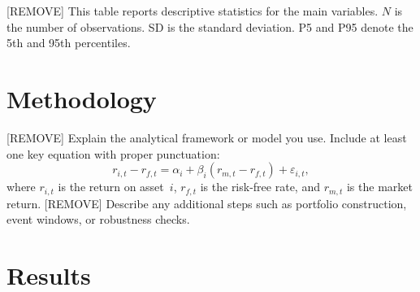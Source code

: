 \documentclass[12pt]{article}
\begin{document}
\begin{table}[!ht]
\caption{[REMOVE] Descriptive Statistics.}
{\footnotesize
[REMOVE] This table reports descriptive statistics for the main
variables. $N$ is the number of observations. SD is the standard
deviation. P5 and P95 denote the 5th and 95th percentiles.}
\vspace{2mm}
\begin{center}
\label{tab:descriptive}
\end{center}
\end{table}




\section{Methodology}\label{sec:methodology}

[REMOVE] Explain the analytical framework or model you use. Include
at least one key equation with proper punctuation:
\begin{equation}\label{eq:model}
  r_{i,t} - r_{f,t}
    = \alpha_i + \beta_i (r_{m,t} - r_{f,t}) + \varepsilon_{i,t},
\end{equation}
where $r_{i,t}$ is the return on asset~$i$, $r_{f,t}$ is the risk-free
rate, and $r_{m,t}$ is the market return. [REMOVE] Describe any
additional steps such as portfolio construction, event windows, or
robustness checks.




\section{Results}\label{sec:results}
\end{document}
